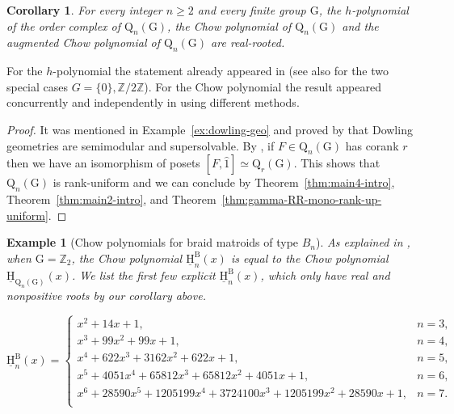 \documentclass[11pt,a4paper]{amsart}
\theoremstyle{results}
\newtheorem{corollary}[thm]{Corollary}
\theoremstyle{definitions}
\newtheorem{example}[thm]{Example}
\def\Z{\mathbb{Z}}
\def\Z{\mathbb{Z}}
\newcommand{\QnG}{\textrm{Q}_n(\textrm{G})}
\newcommand{\uH}{\underline{\mathrm{H}}}
\newcommand{\G}{\textrm{G}}
\newcommand{\un}{\hat{1}}
\newcommand{\Qd}{\mathrm{Q}}
\renewcommand{\hat}{\widehat}
\begin{document}
\begin{corollary}
For every integer $n \geqslant 2$ and every finite group $\G$, the $h$-polynomial of the order complex of $\QnG$, the Chow polynomial of $\QnG$ and the augmented Chow polynomial of $\QnG$ are real-rooted. 
\end{corollary}
For the $h$-polynomial the statement already appeared in \cite[Section 4]{branden-saud1} (see also \cite{athanasiadis-kalampogia} for the two special cases $G=\{0\},\Z/2\Z$). For the Chow polynomial the result appeared concurrently and independently in \cite[Section 6]{branden-vecchi2} using different methods. 
\begin{proof}
It was mentioned in Example~\ref{ex:dowling-geo} and proved by \cite[Theorem 4]{dowling1973class} that Dowling geometries are semimodular and supersolvable. By \cite[Theorem 2(a)]{dowling1973class}, if $F\in \QnG$ has corank $r$ then we have an isomorphism of posets $[F, \un] \simeq \Qd_r(\G).$ This shows that $\QnG$ is rank-uniform and we can conclude by Theorem~\ref{thm:main4-intro}, Theorem~\ref{thm:main2-intro}, and Theorem~\ref{thm:gamma-RR-mono-rank-up-uniform}. 
\end{proof}

\begin{example}[Chow polynomials for braid matroids of type \(B_n\)]
As explained in , when $\G = \Z_2$, the Chow polynomial $\uH^{\textrm{B}}_{n}(x)$ is equal to the Chow polynomial $\uH_{\QnG}(x)$. We list the first few explicit $\uH^{\textrm{B}}_{n}(x)$, which only have real and nonpositive roots by our corollary above. 

\[
\uH_{n}^{\textrm{B}}(x) =
\begin{cases}
x^2 + 14x + 1, & n = 3,\\[4pt]
x^3 + 99x^2 + 99x + 1, & n = 4,\\[4pt]
x^4 + 622x^3 + 3162x^2 + 622x + 1, & n = 5,\\[4pt]
x^5 + 4051x^4 + 65812x^3 + 65812x^2 + 4051x + 1, & n = 6,\\[4pt]
x^6 + 28590x^5 + 1205199x^4 + 3724100x^3 + 1205199x^2 + 28590x + 1, & n = 7.\\[4pt]
\end{cases}
\]
\end{example}
\end{document}
